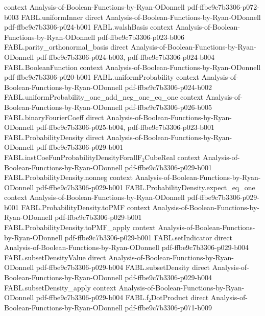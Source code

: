 \begin{theorem}
  {context}
  {Analysis-of-Boolean-Functions-by-Ryan-ODonnell}
  {pdf-ffbe9c7b3306-p072-b003}
\proofstep
  {FABL.uniformInner}
  {direct}
  {Analysis-of-Boolean-Functions-by-Ryan-ODonnell}
  {pdf-ffbe9c7b3306-p024-b001}
\proofstep
  {FABL.walshBasis}
  {context}
  {Analysis-of-Boolean-Functions-by-Ryan-ODonnell}
  {pdf-ffbe9c7b3306-p023-b006}
\proofstep
  {FABL.parity_orthonormal_basis}
  {direct}
  {Analysis-of-Boolean-Functions-by-Ryan-ODonnell}
  {pdf-ffbe9c7b3306-p024-b003,
    pdf-ffbe9c7b3306-p024-b004}
\proofstep
  {FABL.BooleanFunction}
  {context}
  {Analysis-of-Boolean-Functions-by-Ryan-ODonnell}
  {pdf-ffbe9c7b3306-p020-b001}
\proofstep
  {FABL.uniformProbability}
  {context}
  {Analysis-of-Boolean-Functions-by-Ryan-ODonnell}
  {pdf-ffbe9c7b3306-p024-b002}
\proofstep
  {FABL.uniformProbability_one_add_neg_one_eq_one}
  {context}
  {Analysis-of-Boolean-Functions-by-Ryan-ODonnell}
  {pdf-ffbe9c7b3306-p026-b005}
\proofstep
  {FABL.binaryFourierCoeff}
  {direct}
  {Analysis-of-Boolean-Functions-by-Ryan-ODonnell}
  {pdf-ffbe9c7b3306-p025-b004,
    pdf-ffbe9c7b3306-p023-b001}
\proofstep
  {FABL.ProbabilityDensity}
  {direct}
  {Analysis-of-Boolean-Functions-by-Ryan-ODonnell}
  {pdf-ffbe9c7b3306-p029-b001}
\proofstep
  {FABL.instCoeFunProbabilityDensityForallF₂CubeReal}
  {context}
  {Analysis-of-Boolean-Functions-by-Ryan-ODonnell}
  {pdf-ffbe9c7b3306-p029-b001}
\proofstep
  {FABL.ProbabilityDensity.nonneg}
  {context}
  {Analysis-of-Boolean-Functions-by-Ryan-ODonnell}
  {pdf-ffbe9c7b3306-p029-b001}
\proofstep
  {FABL.ProbabilityDensity.expect_eq_one}
  {context}
  {Analysis-of-Boolean-Functions-by-Ryan-ODonnell}
  {pdf-ffbe9c7b3306-p029-b001}
\proofstep
  {FABL.ProbabilityDensity.toPMF}
  {context}
  {Analysis-of-Boolean-Functions-by-Ryan-ODonnell}
  {pdf-ffbe9c7b3306-p029-b001}
\proofstep
  {FABL.ProbabilityDensity.toPMF_apply}
  {context}
  {Analysis-of-Boolean-Functions-by-Ryan-ODonnell}
  {pdf-ffbe9c7b3306-p029-b001}
\proofstep
  {FABL.setIndicator}
  {direct}
  {Analysis-of-Boolean-Functions-by-Ryan-ODonnell}
  {pdf-ffbe9c7b3306-p029-b004}
\proofstep
  {FABL.subsetDensityValue}
  {direct}
  {Analysis-of-Boolean-Functions-by-Ryan-ODonnell}
  {pdf-ffbe9c7b3306-p029-b004}
\proofstep
  {FABL.subsetDensity}
  {direct}
  {Analysis-of-Boolean-Functions-by-Ryan-ODonnell}
  {pdf-ffbe9c7b3306-p029-b004}
\proofstep
  {FABL.subsetDensity_apply}
  {context}
  {Analysis-of-Boolean-Functions-by-Ryan-ODonnell}
  {pdf-ffbe9c7b3306-p029-b004}
\proofstep
  {FABL.f₂DotProduct}
  {direct}
  {Analysis-of-Boolean-Functions-by-Ryan-ODonnell}
  {pdf-ffbe9c7b3306-p071-b009}

\end{theorem}
